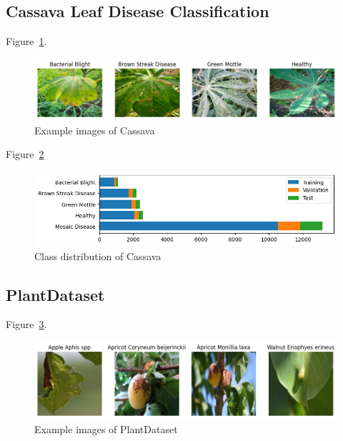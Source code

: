 \subsection{Cassava Leaf Disease Classification}
Figure~\ref{fig:example_images_of_cassava}.

\begin{figure}[H]
    \begin{center}
    \includegraphics[width=15cm]{../images/example_images_of_cassava.png}
    \caption{Example images of Cassava}\label{fig:example_images_of_cassava}
    \end{center}
\end{figure}

Figure~\ref{fig:class_distribution_of_cassava}

\begin{figure}[H]
    \begin{center}
    \includegraphics[width=15cm]{../images/class_distribution_of_cassava.png}
    \caption{Class distribution of Cassava}\label{fig:class_distribution_of_cassava}
    \end{center}
\end{figure}


\subsection{PlantDataset}

Figure~\ref{fig:example_images_of_plantdataset}.

\begin{figure}[H]
    \begin{center}
    \includegraphics[width=15cm]{../images/example_images_of_plantdataset.png}
    \caption{Example images of PlantDataset}\label{fig:example_images_of_plantdataset}
    \end{center}
\end{figure}

